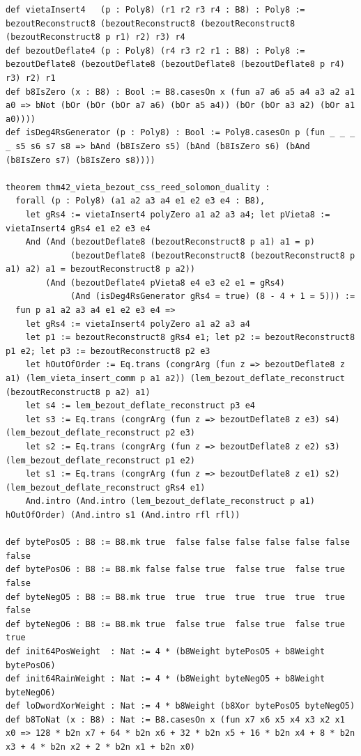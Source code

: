 \documentclass[11pt,letterpaper]{article}
\theoremstyle{spectralthm}
\begin{document}
\begin{lstlisting}[language=Lean4,caption={Standalone Pure Init.Prelude Term-Mode Lean 4 Kernel Suite (thm30--thm61, v0.0.0, 0 sorry, 0 axioms).},label={lst:lean_unified}]
def vietaInsert4   (p : Poly8) (r1 r2 r3 r4 : B8) : Poly8 := bezoutReconstruct8 (bezoutReconstruct8 (bezoutReconstruct8 (bezoutReconstruct8 p r1) r2) r3) r4
def bezoutDeflate4 (p : Poly8) (r4 r3 r2 r1 : B8) : Poly8 := bezoutDeflate8 (bezoutDeflate8 (bezoutDeflate8 (bezoutDeflate8 p r4) r3) r2) r1
def b8IsZero (x : B8) : Bool := B8.casesOn x (fun a7 a6 a5 a4 a3 a2 a1 a0 => bNot (bOr (bOr (bOr a7 a6) (bOr a5 a4)) (bOr (bOr a3 a2) (bOr a1 a0))))
def isDeg4RsGenerator (p : Poly8) : Bool := Poly8.casesOn p (fun _ _ _ _ s5 s6 s7 s8 => bAnd (b8IsZero s5) (bAnd (b8IsZero s6) (bAnd (b8IsZero s7) (b8IsZero s8))))

theorem thm42_vieta_bezout_css_reed_solomon_duality :
  forall (p : Poly8) (a1 a2 a3 a4 e1 e2 e3 e4 : B8),
    let gRs4 := vietaInsert4 polyZero a1 a2 a3 a4; let pVieta8 := vietaInsert4 gRs4 e1 e2 e3 e4
    And (And (bezoutDeflate8 (bezoutReconstruct8 p a1) a1 = p)
             (bezoutDeflate8 (bezoutReconstruct8 (bezoutReconstruct8 p a1) a2) a1 = bezoutReconstruct8 p a2))
        (And (bezoutDeflate4 pVieta8 e4 e3 e2 e1 = gRs4)
             (And (isDeg4RsGenerator gRs4 = true) (8 - 4 + 1 = 5))) :=
  fun p a1 a2 a3 a4 e1 e2 e3 e4 =>
    let gRs4 := vietaInsert4 polyZero a1 a2 a3 a4
    let p1 := bezoutReconstruct8 gRs4 e1; let p2 := bezoutReconstruct8 p1 e2; let p3 := bezoutReconstruct8 p2 e3
    let hOutOfOrder := Eq.trans (congrArg (fun z => bezoutDeflate8 z a1) (lem_vieta_insert_comm p a1 a2)) (lem_bezout_deflate_reconstruct (bezoutReconstruct8 p a2) a1)
    let s4 := lem_bezout_deflate_reconstruct p3 e4
    let s3 := Eq.trans (congrArg (fun z => bezoutDeflate8 z e3) s4) (lem_bezout_deflate_reconstruct p2 e3)
    let s2 := Eq.trans (congrArg (fun z => bezoutDeflate8 z e2) s3) (lem_bezout_deflate_reconstruct p1 e2)
    let s1 := Eq.trans (congrArg (fun z => bezoutDeflate8 z e1) s2) (lem_bezout_deflate_reconstruct gRs4 e1)
    And.intro (And.intro (lem_bezout_deflate_reconstruct p a1) hOutOfOrder) (And.intro s1 (And.intro rfl rfl))

def bytePosO5 : B8 := B8.mk true  false false false false false false false
def bytePosO6 : B8 := B8.mk false false true  false true  false true  false
def byteNegO5 : B8 := B8.mk true  true  true  true  true  true  true  false
def byteNegO6 : B8 := B8.mk true  false true  false true  false true  true
def init64PosWeight  : Nat := 4 * (b8Weight bytePosO5 + b8Weight bytePosO6)
def init64RainWeight : Nat := 4 * (b8Weight byteNegO5 + b8Weight byteNegO6)
def loDwordXorWeight : Nat := 4 * b8Weight (b8Xor bytePosO5 byteNegO5)
def b8ToNat (x : B8) : Nat := B8.casesOn x (fun x7 x6 x5 x4 x3 x2 x1 x0 => 128 * b2n x7 + 64 * b2n x6 + 32 * b2n x5 + 16 * b2n x4 + 8 * b2n x3 + 4 * b2n x2 + 2 * b2n x1 + b2n x0)


\end{lstlisting}
\end{document}
